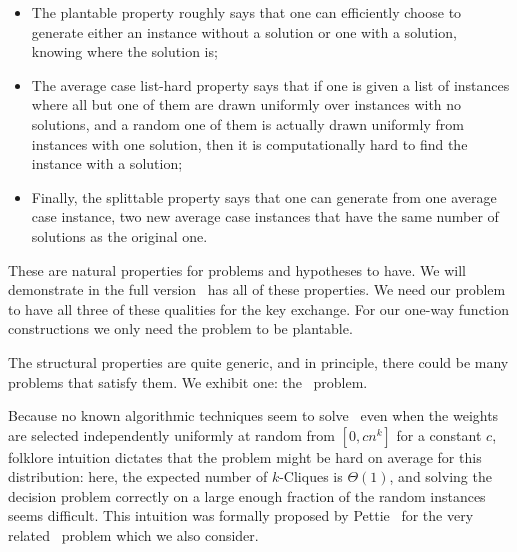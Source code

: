 \begin{itemize}
	\item The plantable property roughly says that one can efficiently choose to generate either an instance without a solution or one with a solution, knowing where the solution is; %
	\item The average case list-hard property says that if one is given a list of instances where all but one of them are drawn uniformly over instances with no solutions, and a random one of them is actually drawn uniformly from instances with one solution, then it is computationally hard to find the instance with a solution;
	\item Finally, the splittable property says that one can generate from one average case instance, two new average case instances that have the same number of solutions as the original one. %
\end{itemize}
These are natural properties for problems and hypotheses to have. We will demonstrate in the full version \zkclique~has all of these properties. We need our problem to have all three of these qualities for the key exchange. For our one-way function constructions we only need the problem to be plantable.



The structural properties are quite generic, and in principle, there could be many problems that satisfy them. We exhibit one: the \zkclique~problem.

Because no known algorithmic techniques seem to solve \zkclique~even when the weights are selected independently uniformly at random from $[0,cn^k]$ for a constant $c$, folklore intuition dictates that the problem might be hard on average for this distribution: here, the expected number of $k$-Cliques is $\Theta(1)$, and solving the decision problem correctly on a large enough fraction of the random instances seems difficult.
This intuition was formally proposed by Pettie~\cite{avgCase3Sum} for the very related \kSum~problem which we also consider.

